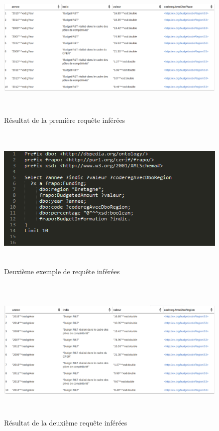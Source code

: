\documentclass[a4paper,sffamily,12pt]{article}
\begin{document}
		\vspace{1cm}
		
		\begin{figure}[!h]
		
			\centerline{\includegraphics[height=7cm]{picture/result_inference1.png}}
			\caption{Résultat de la première requête inférées}
			\label{res1}
			
		\end{figure}		
	
		\newpage
		
		\begin{figure}[!h]
		
			\vspace{0.5cm}		
			\centerline{\includegraphics[height=7cm]{picture/inference2.png}}
			\caption{Deuxième exemple de requête inférées}
			\label{inf2}
			
		\end{figure}		
	
		\vspace{1cm}
		
		\begin{figure}[!h]
		
			\centerline{\includegraphics[height=7cm]{picture/result_inference2.png}}
			\caption{Résultat de la deuxième requête inférées}
			\label{res2}
			
		\end{figure}		
	
\end{document}
